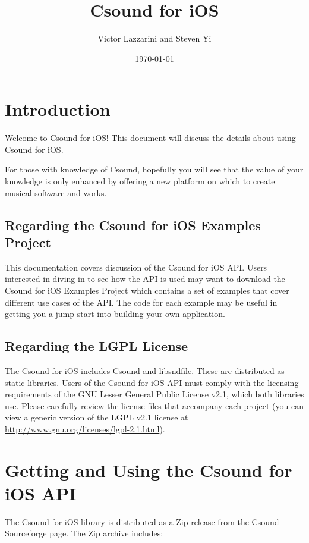 \documentclass[11pt]{article}
\author{Victor Lazzarini and Steven Yi }
\date{\today}
\title{Csound for iOS}
\begin{document}
\maketitle

\section{Introduction}

Welcome to Csound for iOS! This document will discuss the details about using Csound for iOS.  

For those with knowledge of Csound, hopefully you will see that the value of your knowledge is only enhanced by offering a new platform on which to create musical software and works. 

\subsection{Regarding the Csound for iOS Examples Project}

This documentation covers discussion of the Csound for iOS API.  Users interested in diving in to see how the API is used may want to download the Csound for iOS Examples Project which contains a set of examples that cover different use cases of the API. The code for each example may be useful in getting you a jump-start into building your own application.

\subsection{Regarding the LGPL License}

The Csound for iOS includes Csound and \href{http://mega-nerd.com/libsndfile/}{libsndfile}. These are distributed as static libraries. Users of the Csound for iOS API must comply with the licensing requirements of the GNU Lesser General Public License v2.1, which both libraries use. Please carefully review the license files that accompany each project (you can view a generic version of the LGPL v2.1 license at \href{http://www.gnu.org/licenses/lgpl-2.1.html}{http://www.gnu.org/licenses/lgpl-2.1.html}). 


\section{Getting and Using the Csound for iOS API}

The Csound for iOS library is distributed as a Zip release from the Csound Sourceforge page. The Zip archive includes:
\end{document}
